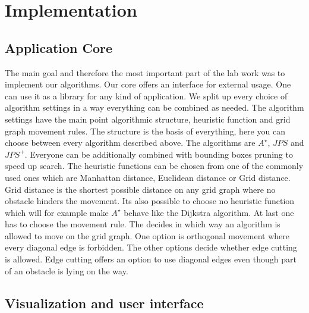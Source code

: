 \documentclass{article}
\begin{document}
    
    
    
    \section{Implementation}
    
    \subsection{Application Core}
    
    The main goal and therefore the most important part of the lab work was to implement our algorithms. Our core offers an interface for external usage. One can use it as a library for any kind of application. We split up every choice of algorithm settings in a way everything can be combined as needed. The algorithm settings have the main point algorithmic structure, heuristic function and grid graph movement rules. The structure is the basis of everything, here you can choose between every algorithm described above. The algorithms are $A^\star$, $JPS$ and $JPS^+$. Everyone can be additionally combined with bounding boxes pruning to speed up search. The heuristic functions can be chosen from one of the commonly used ones which are Manhattan distance, Euclidean distance or Grid distance. Grid distance is the shortest possible distance on any grid graph where no obstacle hinders the movement. Its also possible to choose no heuristic function which will for example make $A^\star$ behave like the Dijkstra algorithm. At last one has to choose the movement rule. The decides in which way an algorithm is allowed to move on the grid graph. One option is orthogonal movement where every diagonal edge is forbidden. The other options decide whether edge cutting is allowed. Edge cutting offers an option to use diagonal edges even though part of an obstacle is lying on the way.
    
    
    \subsection{Visualization and user interface}
    
\end{document}
